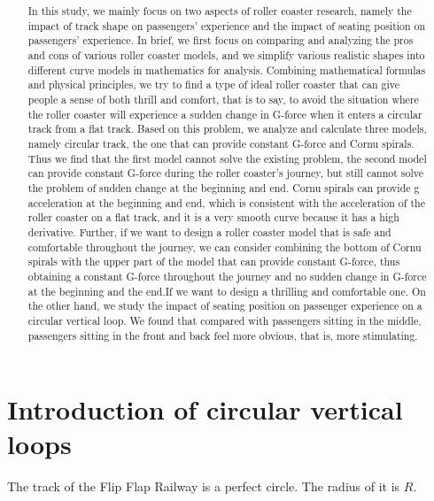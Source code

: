 \documentclass{article}
\title{
    \vspace{2in}
    \textmd{\textbf{\hmwkTitle}}\\
    \vspace{3in}
}
\author{\hmwkAuthorName}
\date{}
\begin{document}
\maketitle

\pagebreak
\begin{abstract}
    In this study, we mainly focus on two aspects of roller coaster research, namely the impact of track shape on passengers' experience and the impact of seating position on passengers' experience. In brief, we first focus on comparing and analyzing the pros and cons of various roller coaster models, and we simplify various realistic shapes into different curve models in mathematics for analysis. Combining mathematical formulas and physical principles, we try to find a type of ideal roller coaster that can give people a sense of both thrill and comfort, that is to say, to avoid the situation where the roller coaster will experience a sudden change in G-force when it enters a circular track from a flat track. Based on this problem, we analyze and calculate three models, namely circular track, the one that can provide constant G-force and Cornu spirals. Thus we find that the first model cannot solve the existing problem, the second model can provide constant G-force during the roller coaster’s journey, but still cannot solve the problem of sudden change at the beginning and end. Cornu spirals can provide g acceleration at the beginning and end, which is consistent with the acceleration of the roller coaster on a flat track, and it is a very smooth curve because it has a high derivative. Further, if we want to design a roller coaster model that is safe and comfortable throughout the journey, we can consider combining the bottom of Cornu spirals with the upper part of the model that can provide constant G-force, thus obtaining a constant G-force throughout the journey and no sudden change in G-force at the beginning and  the  end.If we want to design a thrilling and comfortable one. On the other hand, we study the impact of seating position on passenger experience on a circular vertical loop. We found that compared with passengers sitting in the middle, passengers sitting in the front and back feel more obvious, that is, more stimulating.
\end{abstract}
\pagebreak
\section{Introduction of circular vertical loops}

    The track of the Flip Flap Railway is a perfect circle. The radius of it is $R$.
\end{document}
